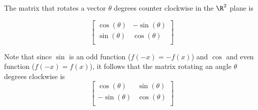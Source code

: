 \documentclass[../main.tex]{subfiles}
\begin{document}
\begin{definition}
    The matrix that rotates a vector $\theta$ degrees counter clockwise
    in the $\R^2$ plane is 

    \[
        \begin{bmatrix}
            \cos(\theta) & -\sin(\theta) \\
            \sin(\theta) & \cos(\theta) \\
        \end{bmatrix}
    \]

    Note that since $\sin$ is an odd function ($f(-x) = -f(x)$) and $\cos$ and even function ($f(-x) = f(x)$), it follows that the matrix rotating an angle $\theta$ degrees clockwise is
    \[
        \begin{bmatrix}
            \cos(\theta) & \sin(\theta) \\
            -\sin(\theta) & \cos(\theta) \\
        \end{bmatrix}
    \]

\end{definition}
\end{document}

